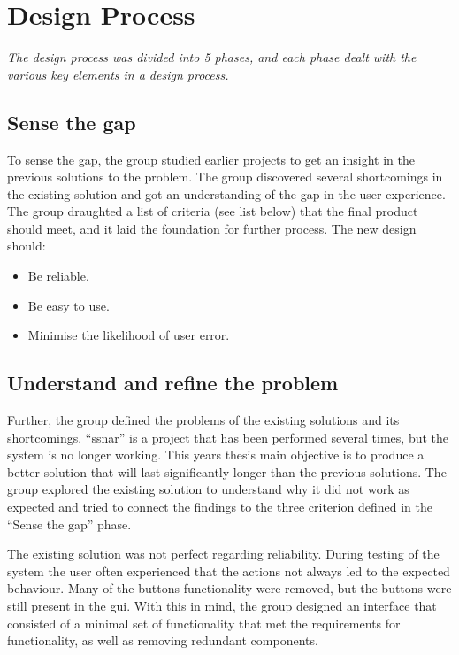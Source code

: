 \section{Design Process}
\label{sec:hcimethod}
\textit{The design process was divided into 5 phases, and each phase dealt with the various key elements in a design process.}

\subsection{Sense the gap}
\label{sec:sensethegap}
To sense the gap, the group studied earlier projects to get an insight in the previous solutions to the problem. The group discovered several shortcomings in the existing solution and got an understanding of the gap in the user experience. The group draughted a list of criteria (see list below) that the final product should meet, and it laid the foundation for further process. The new design should:

\begin{itemize}
    \item Be reliable.
    \item Be easy to use.
    \item Minimise the likelihood of user error.
\end{itemize}

\subsection{Understand and refine the problem}
\label{sec:understprob}
Further, the group defined the problems of the existing solutions and its shortcomings. ``\acrlong{ssnar}'' is a project that has been performed several times, but the system is no longer working. This years thesis main objective is to produce a better solution that will last significantly longer than the previous solutions. The group explored the existing solution to understand why it did not work as expected and tried to connect the findings to the three criterion defined in the ``Sense the gap'' phase.

The existing solution was not perfect regarding reliability. During testing of the system the user often experienced that the actions not always led to the expected behaviour. Many of the buttons functionality were removed, but the buttons were still present in the \acrshort{gui}. With this in mind, the group designed an interface that consisted of a minimal set of functionality that met the requirements for functionality, as well as removing redundant components.

